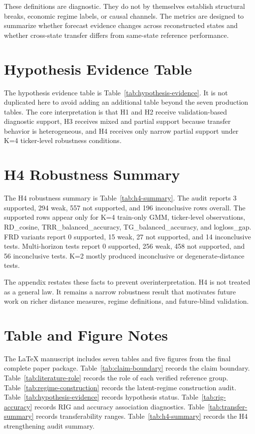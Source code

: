 \documentclass[12pt,a4paper]{article}
\begin{document}
These definitions are diagnostic. They do not by themselves establish structural breaks, economic regime labels, or causal channels. The metrics are designed to summarize whether forecast evidence changes across reconstructed states and whether cross-state transfer differs from same-state reference performance.

\section{Hypothesis Evidence Table}

The hypothesis evidence table is Table~\ref{tab:hypothesis-evidence}. It is not duplicated here to avoid adding an additional table beyond the seven production tables. The core interpretation is that H1 and H2 receive validation-based diagnostic support, H3 receives mixed and partial support because transfer behavior is heterogeneous, and H4 receives only narrow partial support under K=4 ticker-level robustness conditions.

\section{H4 Robustness Summary}

The H4 robustness summary is Table~\ref{tab:h4-summary}. The audit reports 3 supported, 294 weak, 557 not supported, and 196 inconclusive rows overall. The supported rows appear only for K=4 train-only GMM, ticker-level observations, RD\_cosine, TRR\_balanced\_accuracy, TG\_balanced\_accuracy, and logloss\_gap. FRD variants report 0 supported, 15 weak, 27 not supported, and 14 inconclusive tests. Multi-horizon tests report 0 supported, 256 weak, 458 not supported, and 56 inconclusive tests. K=2 mostly produced inconclusive or degenerate-distance tests.

The appendix restates these facts to prevent overinterpretation. H4 is not treated as a general law. It remains a narrow robustness result that motivates future work on richer distance measures, regime definitions, and future-blind validation.

\section{Table and Figure Notes}

The LaTeX manuscript includes seven tables and five figures from the final complete paper package. Table~\ref{tab:claim-boundary} records the claim boundary. Table~\ref{tab:literature-role} records the role of each verified reference group. Table~\ref{tab:regime-construction} records the latent-regime construction audit. Table~\ref{tab:hypothesis-evidence} records hypothesis status. Table~\ref{tab:rig-accuracy} records RIG and accuracy association diagnostics. Table~\ref{tab:transfer-summary} records transferability ranges. Table~\ref{tab:h4-summary} records the H4 strengthening audit summary.
\end{document}
